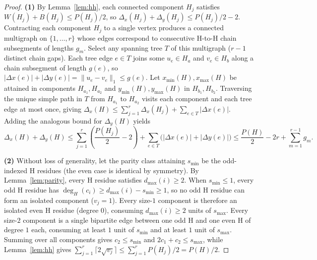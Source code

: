 \documentclass[11pt]{article}
\begin{document}
\begin{proof}
\textbf{(1)} By Lemma~\ref{lem:hh}, each connected component $H_j$ satisfies $W(H_j) + B(H_j) \le P(H_j)/2$, so $\Delta_x(H_j) + \Delta_y(H_j) \le P(H_j)/2 - 2$. Contracting each component $H_j$ to a single vertex produces a connected multigraph on $\{1, \dots, r\}$ whose edges correspond to consecutive H-to-H chain subsegments of lengths $g_m$. Select any spanning tree $T$ of this multigraph ($r - 1$ distinct chain gaps). Each tree edge $e \in T$ joins some $u_e \in H_a$ and $v_e \in H_b$ along a chain subsegment of length $g(e)$, so $|\Delta x(e)| + |\Delta y(e)| = \|u_e - v_e\|_1 \le g(e)$. Let $x_{\min}(H), x_{\max}(H)$ be attained in components $H_{a_1}, H_{a_2}$ and $y_{\min}(H), y_{\max}(H)$ in $H_{b_1}, H_{b_2}$. Traversing the unique simple path in $T$ from $H_{a_1}$ to $H_{a_2}$ visits each component and each tree edge at most once, giving $\Delta_x(H) \le \sum_{j=1}^r \Delta_x(H_j) + \sum_{e \in T} |\Delta x(e)|$. Adding the analogous bound for $\Delta_y(H)$ yields
\[
  \Delta_x(H) + \Delta_y(H)
  \le \sum_{j=1}^r \left(\frac{P(H_j)}{2} - 2\right) + \sum_{e \in T} \bigl(|\Delta x(e)| + |\Delta y(e)|\bigr)
  \le \frac{P(H)}{2} - 2r + \sum_{m=1}^{r-1} g_m.
\]

\textbf{(2)} Without loss of generality, let the parity class attaining $s_{\min}$ be the odd-indexed H residues (the even case is identical by symmetry). By Lemma~\ref{lem:parity}, every H residue satisfies $d_{\max}(i) \ge 2$. When $s_{\min} \le 1$, every odd H residue has $\deg_H(c_i) \ge d_{\max}(i) - s_{\min} \ge 1$, so no odd H residue can form an isolated component ($v_j = 1$). Every size-$1$ component is therefore an isolated even H residue (degree $0$), consuming $d_{\max}(i) \ge 2$ units of $s_{\max}$. Every size-$2$ component is a single bipartite edge between one odd H and one even H of degree $1$ each, consuming at least $1$ unit of $s_{\min}$ and at least $1$ unit of $s_{\max}$. Summing over all components gives $c_2 \le s_{\min}$ and $2c_1 + c_2 \le s_{\max}$, while Lemma~\ref{lem:hh} gives $\sum_{j=1}^r \lceil 2\sqrt{v_j}\rceil \le \sum_{j=1}^r P(H_j)/2 = P(H)/2$.


\end{proof}
\end{document}
